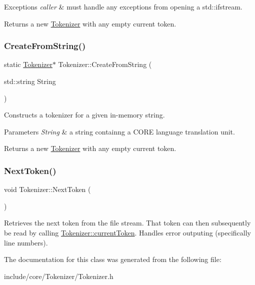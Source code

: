 \begin{DoxyExceptions}{Exceptions}
{\em caller} & must handle any exceptions from opening a std\+::ifstream. \\
\hline
\end{DoxyExceptions}
\begin{DoxyReturn}{Returns}
a new \mbox{\hyperlink{class_tokenizer}{Tokenizer}} with any empty current token. 
\end{DoxyReturn}
\mbox{\label{class_tokenizer_a006144123a37d29a6100c57ea21cde15}} 
\subsubsection{\texorpdfstring{CreateFromString()}{CreateFromString()}}
{\footnotesize\ttfamily static \mbox{\hyperlink{class_tokenizer}{Tokenizer}}$\ast$ Tokenizer\+::\+Create\+From\+String (\begin{DoxyParamCaption}\item[{std\+::string}]{String }\end{DoxyParamCaption})\hspace{0.3cm}{\ttfamily [static]}}

Constructs a tokenizer for a given in-\/memory string. 
\begin{DoxyParams}{Parameters}
{\em String} & a string containng a C\+O\+RE language translation unit. \\
\hline
\end{DoxyParams}
\begin{DoxyReturn}{Returns}
a new \mbox{\hyperlink{class_tokenizer}{Tokenizer}} with any empty current token. 
\end{DoxyReturn}
\mbox{\label{class_tokenizer_aa11b05ea9caa12ea7aa0dfc7f24fa21c}} 
\subsubsection{\texorpdfstring{NextToken()}{NextToken()}}
{\footnotesize\ttfamily void Tokenizer\+::\+Next\+Token (\begin{DoxyParamCaption}{ }\end{DoxyParamCaption})}

Retrieves the next token from the file stream. That token can then subsequently be read by calling {\ttfamily \mbox{\hyperlink{class_tokenizer_ab1963dc9bf28086609425b8ff44bf6e3}{Tokenizer\+::current\+Token}}}. Handles error outputing (specifically line numbers). 

The documentation for this class was generated from the following file\+:\begin{DoxyCompactItemize}
\item 
include/core/\+Tokenizer/Tokenizer.\+h\end{DoxyCompactItemize}
